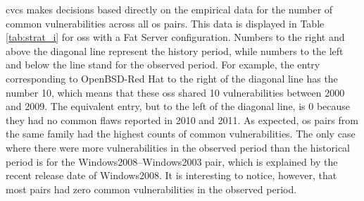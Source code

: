 \gls{cvcs} makes decisions based directly on the empirical data for the number of common vulnerabilities across all \gls{os} pairs. 
This data is displayed in Table \ref{tab:strat_i} for \glspl{os} with a Fat Server configuration. 
Numbers to the right and above the diagonal line represent the history period, while numbers to the left and below the line stand for the observed period. 
For example, the entry corresponding to OpenBSD-Red Hat to the right of the diagonal line has the number 10, which means that these \glspl{os} shared 10 vulnerabilities between 2000 and 2009. 
The equivalent entry, but to the left of the diagonal line, is 0 because they had no common flaws reported in 2010 and 2011. 
As expected, \gls{os} pairs from the same family had the highest counts of common vulnerabilities. 
The only case where there were more vulnerabilities in the observed period than the historical period is for the Windows2008--Windows2003 pair, which is explained by the recent release date of Windows2008. 
It is interesting to notice, however, that most pairs had zero common vulnerabilities in the observed period.


